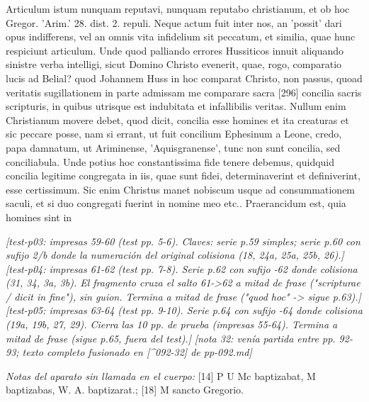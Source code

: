 Articulum istum nunquam reputavi, nunquam reputabo christianum, et ob hoc Gregor. 'Arim.' 28. dist. 2. repuli. Neque actum fuit inter nos, an 'possit' dari opus indifferens, vel an omnis vita infidelium sit peccatum, et similia, quae hunc respiciunt articulum. Unde quod palliando errores Hussiticos innuit aliquando sinistre verba intelligi, sicut Domino Christo evenerit, quae, rogo, comparatio lucis ad Belial? quod Johannem Huss in hoc comparat Christo, non passus, quoad veritatis sugillationem in parte admissam me comparare sacra [296] concilia sacris scripturis, in quibus utrisque est indubitata et infallibilis veritas. Nullum enim Christianum movere debet, quod dicit, concilia esse homines et ita creaturas et sic peccare posse, nam si errant, ut fuit concilium Ephesinum a Leone, credo, papa damnatum, ut Ariminense, 'Aquisgranense', tunc non sunt concilia, sed conciliabula. Unde potius hoc constantissima fide tenere debemus, quidquid concilia legitime congregata in iis, quae sunt fidei, determinaverint et definiverint, esse certissimum. Sic enim Christus manet nobiscum usque ad consummationem saculi, et si duo congregati fuerint in nomine meo etc.. Praerancidum est, quia homines sint in

\noindent\textit{[test-p03: impresas 59-60 (test pp. 5-6). Claves: serie p.59 simples; serie p.60 con sufijo 2/b donde la numeración del original colisiona (18, 24a, 25a, 25b, 26).]}
\noindent\textit{[test-p04: impresas 61-62 (test pp. 7-8). Serie p.62 con sufijo -62 donde colisiona (31, 34, 3a, 3b). El fragmento cruza el salto 61->62 a mitad de frase ("scripturae / dicit in fine"), sin guion. Termina a mitad de frase ("quod hoc" -> sigue p.63).]}
\noindent\textit{[test-p05: impresas 63-64 (test pp. 9-10). Serie p.64 con sufijo -64 donde colisiona (19a, 19b, 27, 29). Cierra las 10 pp. de prueba (impresas 55-64). Termina a mitad de frase (sigue p.65, fuera del test).]}
\noindent\textit{[nota 32: venía partida entre pp. 92-93; texto completo fusionado en [\textasciicircum{}092-32] de pp-092.md]}

\noindent\textit{Notas del aparato sin llamada en el cuerpo:} [14] P U Mc baptizabat, M baptizabas, W. A. baptizarat.; [18] M sancto Gregorio.
